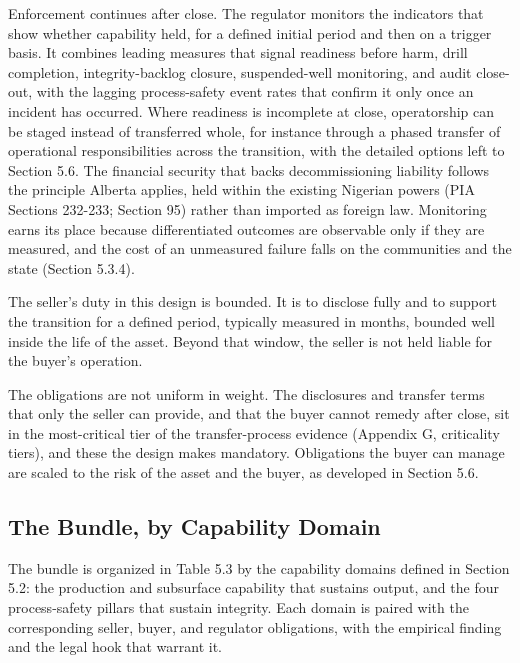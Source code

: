 \documentclass[twoside,fontset=lmodern]{mitthesis}
\begin{document}
Enforcement continues after close. The regulator monitors the indicators
that show whether capability held, for a defined initial period and then
on a trigger basis. It combines leading measures that signal readiness
before harm, drill completion, integrity-backlog closure, suspended-well
monitoring, and audit close-out, with the lagging process-safety event
rates that confirm it only once an incident has occurred. Where
readiness is incomplete at close, operatorship can be staged instead of
transferred whole, for instance through a phased transfer of operational
responsibilities across the transition, with the detailed options left
to Section 5.6. The financial security that backs decommissioning
liability follows the principle Alberta applies, held within the
existing Nigerian powers (PIA Sections 232-233; Section 95) rather than
imported as foreign law. Monitoring earns its place because
differentiated outcomes are observable only if they are measured, and
the cost of an unmeasured failure falls on the communities and the state
(Section 5.3.4).

The seller's duty in this design is bounded. It is to disclose fully and
to support the transition for a defined period, typically measured in
months, bounded well inside the life of the asset. Beyond that window,
the seller is not held liable for the buyer's operation.

The obligations are not uniform in weight. The disclosures and transfer
terms that only the seller can provide, and that the buyer cannot remedy
after close, sit in the most-critical tier of the transfer-process
evidence (Appendix G, criticality tiers), and these the design makes
mandatory. Obligations the buyer can manage are scaled to the risk of
the asset and the buyer, as developed in Section 5.6.

\hypertarget{the-bundle-by-capability-domain}{%
\subsection{The Bundle, by Capability
Domain}\label{the-bundle-by-capability-domain}}

The bundle is organized in Table 5.3 by the capability domains defined
in Section 5.2: the production and subsurface capability that sustains
output, and the four process-safety pillars that sustain integrity. Each
domain is paired with the corresponding seller, buyer, and regulator
obligations, with the empirical finding and the legal hook that warrant
it.
\end{document}
